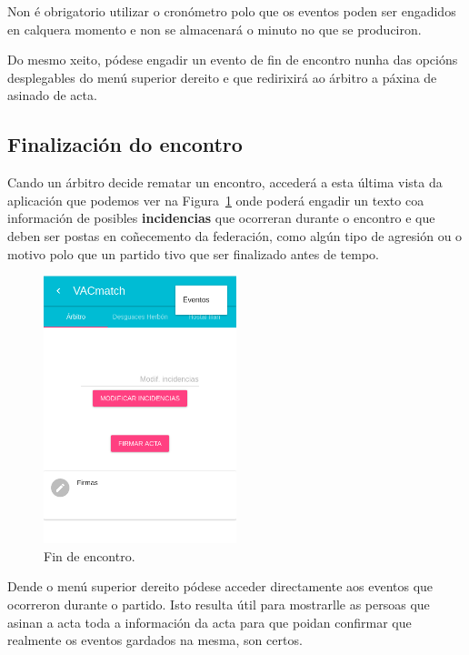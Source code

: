       Non é obrigatorio utilizar o cronómetro polo que os eventos poden ser 
engadidos en calquera momento e non se almacenará o minuto no que se produciron.

      Do mesmo xeito, pódese engadir un evento de fin de encontro nunha das 
opcións desplegables do menú superior dereito e que redirixirá ao árbitro a 
páxina de asinado de acta.

    \subsection{Finalización do encontro}
    Cando un árbitro decide rematar un encontro, accederá a esta última vista 
da aplicación que podemos ver na Figura~\ref{fig:design:endmatch} onde 
poderá engadir un texto coa información de posibles 
\textbf{incidencias} que ocorreran durante o encontro e que deben ser postas en 
coñecemento da federación, como algún tipo de agresión ou o motivo polo que un 
partido tivo que ser finalizado antes de tempo.

    \begin{figure}[h!]
      \begin{center}
      \includegraphics[width=0.5\textwidth]{./img/demo/10_endmatch.png}
      \caption{Fin de encontro.}
      \label{fig:design:endmatch}
      \end{center}
    \end{figure}

    Dende o menú superior dereito pódese acceder directamente aos eventos que 
ocorreron durante o partido. Isto resulta útil para mostrarlle as persoas que 
asinan a acta toda a información da acta para que poidan confirmar que 
realmente os eventos gardados na mesma, son certos.

